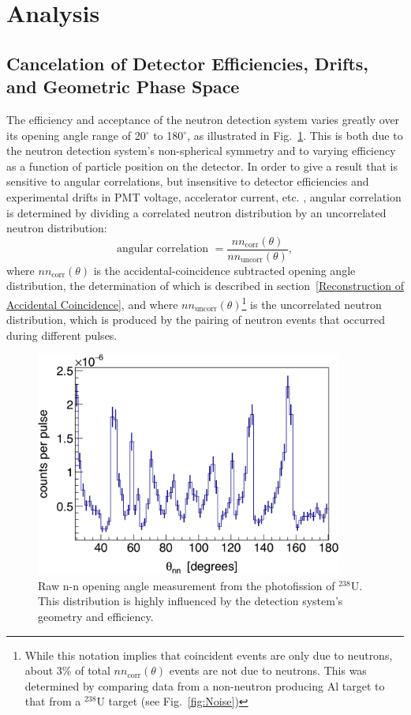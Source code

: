 \section{Analysis}
\label{Analysis}

\subsection{Cancelation of Detector Efficiencies, Drifts, and Geometric Phase Space}
\label{subsec:SPDPCancelation}
The efficiency and acceptance of the neutron detection system varies greatly over its opening angle range of 20$^{\circ}$ to 180$^{\circ}$, as illustrated in Fig.~\ref{fig:DetAcceptance}.
This is both due to the neutron detection system's non-spherical symmetry and to varying efficiency as a function of particle position on the detector.
In order to give a result that is sensitive to angular correlations, but insensitive to detector efficiencies and experimental drifts in PMT voltage, accelerator current, etc. , angular correlation is determined by dividing a correlated neutron distribution by an uncorrelated neutron distribution:
\begin{equation}
\label{eq:angularCorr}
\text{angular correlation }  = \frac{nn_{\text{corr}}(\theta)}{nn_{\text{uncorr}}(\theta)},
\end{equation}
where $nn_{\text{corr}}(\theta)$ is the accidental-coincidence subtracted opening angle distribution, the determination of which is described in section~\ref{Reconstruction of Accidental Coincidence}, and where $nn_{\text{uncorr}}(\theta)$\footnote{While this notation implies that coincident events are only due to neutrons, about 3\% of total  $nn_{\text{corr}}(\theta)$ events are not due to neutrons. This was determined by comparing data from a non-neutron producing Al target to that from a $^{238}$U target (see Fig.~\ref{fig:Noise})} is the uncorrelated neutron distribution, which is produced by the pairing of neutron events that occurred during different pulses.
\begin{figure}[h]
\includegraphics[width=0.9\textwidth]{Content/Methods/DetAcceptance.png}
\caption{Raw n-n opening angle measurement from the photofission of $^{238}$U. 
This distribution is highly influenced by the detection system's geometry and efficiency.
}
\label{fig:DetAcceptance}
\end{figure}

